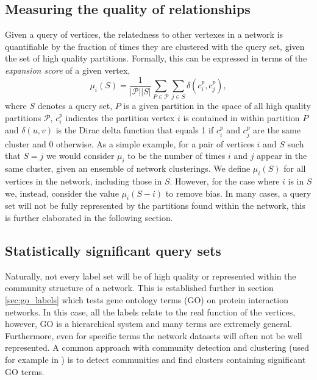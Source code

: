 \documentclass[sigconf]{acmart}
\begin{document}
\subsection{Measuring the quality of relationships} \label{sec:expansion}
Given a query of vertices, the relatedness to other vertexes in a network is quantifiable by the fraction of times they are clustered with the query set, given the set of high quality partitions.
Formally, this can be expressed in terms of the \textit{expansion score} of a given vertex,
\begin{equation} \label{eq:mu_score}
\mu_i(S) = \frac{1}{|\mathcal{P}| |S| } \sum_{P \in \mathcal{P}} \sum_{j \in S} \delta(c^{p}_i, c^{p}_j),
\end{equation}
where $S$ denotes a query set, $P$ is a given partition in the space of all high quality partitions $\mathcal{P}$, $c^{p}_{i}$ indicates the partition vertex $i$ is contained in within partition $P$ and
$\delta(u, v)$ is the Dirac delta function that equals 1 if $c^{p}_i$ and  $c^{p}_j$ are the same cluster and $0$ otherwise.
As a simple example, for a pair of vertices $i$ and $S$ such that $S = {j}$ we would consider $\mu_i$ to be the number of times $i$ and $j$ appear in the same cluster, given an ensemble of network clusterings.
We define $\mu_i(S)$ for all vertices in the network, including those in $S$.
However, for the case where $i$ is in $S$ we, instead, consider the value $\mu_i(S - i)$ to remove bias.
In many cases, a query set will not be fully represented by the partitions found within the network, this is further elaborated in the following section.

\subsection{Statistically significant query sets}
\label{sec:query_sign}
Naturally, not every label set will be of high quality or represented within the community structure of a network.
This is established further in section \ref{sec:go_labels} which tests gene ontology terms (GO) on protein interaction networks.
In this case, all the labels relate to the real function of the vertices, however, GO is a hierarchical system and many terms are extremely general.
Furthermore, even for specific terms the network datasets will often not be well represented.
A common approach with community detection and clustering (used for example in \cite{dekkers2013}) is to detect communities and find clusters containing significant GO terms.
\end{document}
